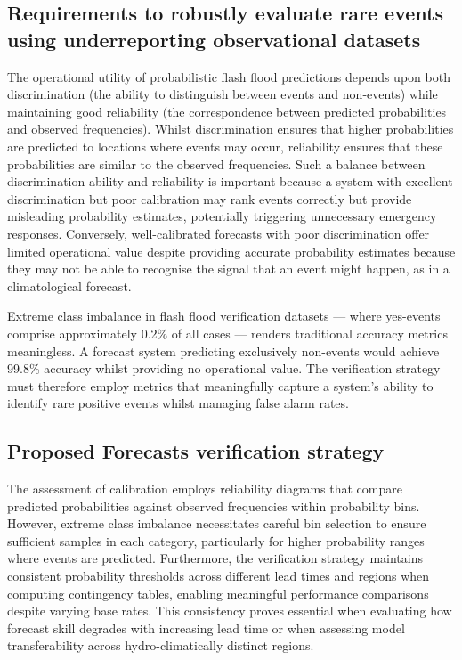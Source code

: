 \subsection{Requirements to robustly evaluate rare events using underreporting observational datasets}

The  operational utility of probabilistic flash flood predictions depends upon both discrimination (the ability to distinguish between events and non-events) while maintaining good reliability (the correspondence between predicted probabilities and observed frequencies). Whilst discrimination ensures that higher probabilities are predicted to locations where events may occur, reliability ensures that these probabilities are similar to the observed frequencies. Such a balance between discrimination ability and reliability is important because a system with excellent discrimination but poor calibration may rank events correctly but provide misleading probability estimates, potentially triggering unnecessary emergency responses. Conversely, well-calibrated forecasts with poor discrimination offer limited operational value despite providing accurate probability estimates because they may not be able to recognise the signal that an event might happen, as in a climatological forecast.

Extreme  class imbalance in flash flood verification datasets — where yes-events comprise approximately 0.2\% of all cases — renders traditional accuracy metrics meaningless. A forecast system predicting exclusively non-events would achieve 99.8\% accuracy whilst providing no operational value. The verification strategy must therefore employ metrics that meaningfully capture a system's ability to identify rare positive events whilst managing false alarm rates. 


\subsection{Proposed Forecasts verification strategy}

The  assessment of calibration employs reliability diagrams that compare predicted probabilities against observed frequencies within probability bins. However, extreme class imbalance necessitates careful bin selection to ensure sufficient samples in each category, particularly for higher probability ranges where events are predicted. Furthermore, the verification strategy maintains consistent probability thresholds across different lead times and regions when computing contingency tables, enabling meaningful performance comparisons despite varying base rates. This consistency proves essential when evaluating how forecast skill degrades with increasing lead time or when assessing model transferability across hydro-climatically distinct regions.

